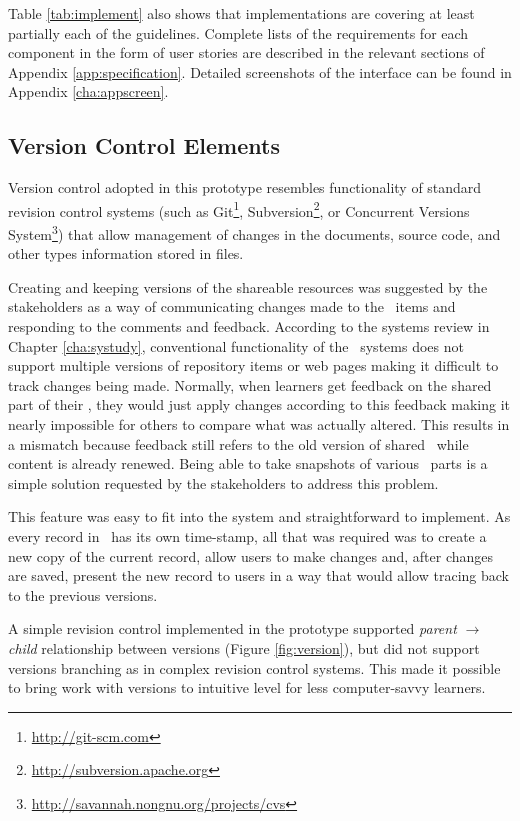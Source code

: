 \FloatBarrier

Table \ref{tab:implement} also shows that implementations are covering at least
partially each of the guidelines. Complete lists of the requirements for each
component in the form of user stories are described in the relevant sections of
Appendix \ref{app:specification}. Detailed screenshots of the interface can be
found in Appendix \ref{cha:appscreen}.

\subsection{Version Control Elements}
\label{sec:version}

Version control adopted in this prototype resembles functionality of standard
revision control systems (such as Git\footnote{\url{http://git-scm.com}},
Subversion\footnote{\url{http://subversion.apache.org}}, or Concurrent Versions
System\footnote{\url{http://savannah.nongnu.org/projects/cvs}}) that allow
management of changes in the documents, source code, and other types information
stored in files.

Creating and keeping versions of the shareable resources was suggested by the
stakeholders as a way of communicating changes made to the \ep~items and
responding to the comments and feedback. According to the systems review in
Chapter \ref{cha:systudy}, conventional functionality of the \ep~systems does not
support multiple versions of repository items or web pages making it difficult
to track changes being made. Normally, when learners get feedback on the shared
part of their \ep, they would just apply changes according to this feedback
making it nearly impossible for others to compare what was actually altered.
This results in a mismatch because feedback still refers to the old version of
shared \ep~while content is already renewed. Being able to take snapshots of
various \ep~parts is a simple solution requested by the stakeholders to address
this problem.

This feature was easy to fit into the system and straightforward to implement.
As every record in \ep~has its own time-stamp, all that was required was to
create a new copy of the current record, allow users to make changes and,
after changes are saved, present the new record to users in a way that would
allow tracing back to the previous versions.

A simple revision control implemented in the prototype supported \textit{parent}
$\to$ \textit{child} relationship between versions (Figure \ref{fig:version}),
but did not support versions branching as in complex revision control systems.
This made it possible to bring work with versions to intuitive level for less
computer-savvy learners.

